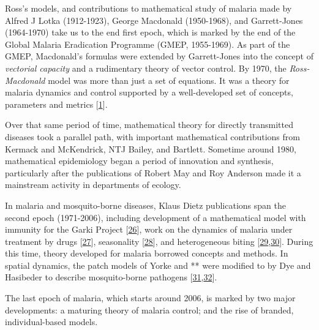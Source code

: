 \documentclass[
]{book}
\begin{document}
Ross's models, and contributions to mathematical study of malaria made by Alfred J Lotka (1912-1923), George Macdonald (1950-1968), and Garrett-Jones (1964-1970) take us to the end first epoch, which is marked by the end of the Global Malaria Eradication Programme (GMEP, 1955-1969). As part of the GMEP, Macdonald's formulas were extended by Garrett-Jones into the concept of \emph{vectorial capacity} and a rudimentary theory of vector control. By 1970, the \emph{Ross-Macdonald} model was more than just a set of equations. It was a theory for malaria dynamics and control supported by a well-developed set of concepts, parameters and metrics {[}\protect\hyperlink{ref-SmithDL2012_RossMacdonald}{1}{]}.

Over that same period of time, mathematical theory for directly transmitted diseases took a parallel path, with important mathematical contributions from Kermack and McKendrick, NTJ Bailey, and Bartlett. Sometime around 1980, mathematical epidemiology began a period of innovation and synthesis, particularly after the publications of Robert May and Roy Anderson made it a mainstream activity in departments of ecology.

In malaria and mosquito-borne diseases, Klaus Dietz publications span the second epoch (1971-2006), including development of a mathematical model with immunity for the Garki Project {[}\protect\hyperlink{ref-DietzK1974MalariaModel}{26}{]}, work on the dynamics of malaria under treatment by drugs {[}\protect\hyperlink{ref-DietzK1975ModelsParasitic}{27}{]}, seasonality {[}\protect\hyperlink{ref-DietzK1976IncidenceInfectious}{28}{]}, and heterogeneous biting {[}\protect\hyperlink{ref-DietzK1980ModelsVectorborne}{29},\protect\hyperlink{ref-DietzK1988EpidemiologicalModels}{30}{]}. During this time, theory developed for malaria borrowed concepts and methods. In spatial dynamics, the patch models of Yorke and ** were modified to by Dye and Hasibeder to describe mosquito-borne pathogens {[}\protect\hyperlink{ref-DyeC1986PopulationDynamics}{31},\protect\hyperlink{ref-HasibederG1988PopulationDynamics}{32}{]}.

The last epoch of malaria, which starts around 2006, is marked by two major developments: a maturing theory of malaria control; and the rise of branded, individual-based models.
\end{document}
